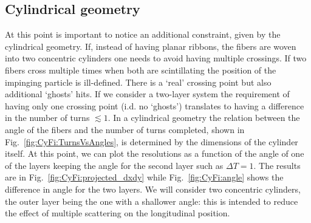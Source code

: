 \begin{refsection}
    \subsection{Cylindrical geometry}
        At this point is important to notice an additional constraint, given by the cylindrical geometry.
        If, instead of having planar ribbons, the fibers are woven into two concentric cylinders one needs to avoid having multiple crossings.
        If two fibers cross multiple times when both are scintillating the position of the impinging particle is ill-defined. There is a `real' crossing point but also additional `ghosts' hits.
        If we consider a two-layer system the requirement of having only one crossing point (i.d. no `ghosts') translates to having a difference in the number of turns $\lesssim1$. 
        In a cylindrical geometry the relation between the angle of the fibers and the number of turns completed, shown in Fig.~\ref{fig:CyFi:TurnsVsAngles}, is determined by the dimensions of the cylinder itself.
        At this point, we can plot the resolutions as a function of the angle of one of the layers keeping the angle for the second layer such as $\Delta T=1$. The results are in Fig.~\ref{fig:CyFi:projected_dxdy} while Fig.~\ref{fig:CyFi:angle} shows the difference in angle for the two layers.
        We will consider two concentric cylinders, the outer layer being the one with a shallower angle: this is intended to reduce the effect of multiple scattering on the longitudinal position.
        \begin{figure}
\end{figure}
\end{refsection}

